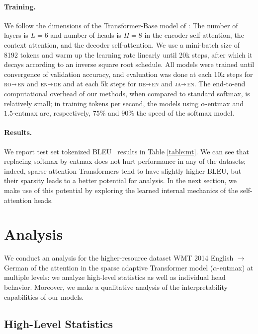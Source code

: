 \documentclass[11pt,a4paper]{article}
\newcommand*\entmaxtext{entmax\xspace}
\newcommand{\langp}[2]{\textsc{#1}$\shortrightarrow$\textsc{#2}}
\begin{document}
\paragraph{Training.}
We follow the dimensions of the Transformer-Base model of
\citet{vaswani2017attention}: The number of layers is $L=6$ and
number of heads is $H=8$ in the encoder self-attention, the context
attention, and the decoder self-attention. We use a mini-batch size
of 8192 tokens and warm up the learning rate linearly until 20k
steps, after which it decays according to an inverse square root
schedule. All models were trained until convergence of validation
accuracy, and evaluation was done at each 10k steps for
\langp{ro}{en} and \langp{en}{de} and at each 5k steps for
\langp{de}{en} and \langp{ja}{en}. The end-to-end computational
overhead of our methods, when compared to standard softmax, is
relatively small; in training tokens per second, the models using
$\alpha$-\entmaxtext and $1.5$-\entmaxtext are, respectively, $75\%$
and $90\%$ the speed of the softmax model.

\paragraph{Results.}
We report test set tokenized BLEU~\citep{papineni2002bleu} results in
Table \ref{table:mt}. We can see that replacing softmax by
\entmaxtext{} does not hurt performance in any of the datasets;
indeed, sparse attention Transformers tend to have slightly higher
BLEU, but their sparsity leads to a better potential for analysis. In
the next section, we make use of this potential by exploring the
learned internal mechanics of the self-attention heads.

\section{Analysis}

We conduct an analysis for the higher-resource dataset WMT 2014
English $\rightarrow$ German of the attention in the sparse adaptive
Transformer model ($\alpha$-\entmaxtext) at multiple levels: we
analyze high-level statistics as well as individual head behavior.
Moreover, we make a qualitative analysis of the interpretability
capabilities of our models.

\subsection{High-Level Statistics}
\label{sec:stats}
\end{document}
